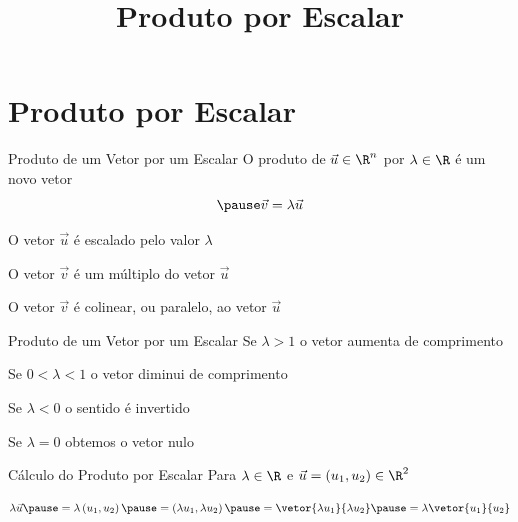 \documentclass[fleqn,aspectratio=169,12pt]{beamer}
\title{Produto por Escalar}
\begin{document}
\addtitle

\section{Produto por Escalar}

\begin{frame}{Produto de um Vetor por um Escalar}
  O produto de $\vec{u} \in \R^n$
  \pause
  por $\lambda \in \R$ é um novo vetor
  \[
    \pause
    \vec{v} = \lambda \vec{u}
  \]

  \pause
  O vetor $\vec{u}$ é escalado pelo valor $\lambda$

  \pause
  O vetor $\vec{v}$ é um múltiplo do vetor $\vec{u}$

  \pause
  O vetor $\vec{v}$ é colinear, ou paralelo, ao vetor $\vec{u}$
\end{frame}


\begin{frame}{Produto de um Vetor por um Escalar}
  \pause
  Se \; $\lambda>1$   \tabto{30mm} o vetor aumenta de comprimento

  \pause
  \smallskip
  Se \; $0<\lambda<1$ \tabto{30mm} o vetor diminui de comprimento

  \pause
  \smallskip
  Se \; $\lambda<0$   \tabto{30mm} o sentido é invertido

  \pause
  \smallskip
  Se \; $\lambda=0$   \tabto{30mm} obtemos o vetor nulo
\end{frame}

\begin{frame}{Cálculo do Produto por Escalar}
  Para
  \(
    \lambda \in \R
  \)
  \pause
  e
  \(
    \vec{u}
    = ( u_1, u_2 )
    \in \R^2
  \)

  \pause
  \[
    \lambda\vec{u}
    \pause
    = \lambda \left( u_1, u_2 \right)
    \pause
    = \left( \lambda u_1, \lambda u_2 \right)
    \pause
    = \vetor{\lambda u_1}{\lambda u_2}
    \pause
    = \lambda \vetor{u_1}{u_2}
  \]
\end{frame}
\end{document}
